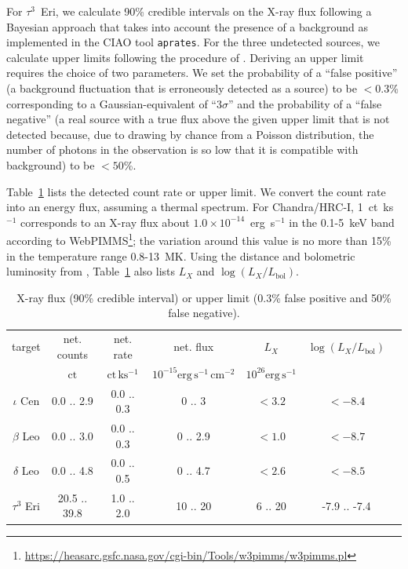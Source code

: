 \documentclass[linenumbers]{aastex631}
\begin{document}
For $\tau^3$~Eri, we calculate 90\% credible intervals on the X-ray flux following a Bayesian approach that
takes into account the presence of a background \citep{2014ApJ...796...24P} as implemented in the CIAO tool \texttt{aprates}. For the three undetected sources, we calculate upper limits following the procedure of \citet{2010ApJ...719..900K}. Deriving an upper limit requires the choice of two parameters. We set the probability of a ``false positive'' (a background fluctuation that is erroneously detected as a source) to be $<0.3$\% corresponding to a
Gaussian-equivalent of ``$3\sigma$'' and the probability of a ``false negative'' (a real source with a true flux above the given upper limit that is not detected because, due to drawing by chance from a Poisson distribution,  the number of photons in the observation is so low that it is compatible with background) to be $<50$\%.


Table~\ref{tab:detections} lists the detected count rate or upper limit. We convert the count rate into an energy flux, assuming a thermal spectrum. For Chandra/HRC-I,
1~ct~ks$^{-1}$ corresponds to an X-ray flux about $1.0\times10^{-14}$~erg~s$^{-1}$ in the 0.1-5~keV band according to WebPIMMS\footnote{\url{https://heasarc.gsfc.nasa.gov/cgi-bin/Tools/w3pimms/w3pimms.pl}}; the variation around this value is no more than 15\% in the temperature range 0.8-13~MK. Using the distance and bolometric luminosity from \citet{2002ApJ...579..800S}, Table~\ref{tab:detections} also lists $L_X$ and $\log(L_X/L_\mathrm{bol})$.
\begin{table}
\caption{X-ray flux (90\% credible interval) or upper limit (0.3\% false positive and 50\% false negative).\label{tab:detections}}
\begin{tabular}{ccccccc}
  \hline \hline
target & net. counts & net. rate & net. flux & $L_X$ & $\log(L_X/L_\mathrm{bol})$\\
 & $\mathrm{ct}$ & $\mathrm{ct\,ks^{-1}}$ & $10^{-15}\mathrm{erg\,s^{-1}\,cm^{-2}}$ & $10^{26}\mathrm{erg\,s^{-1}}$ \\
\hline
$\iota$ Cen & 0.0 ..  2.9 & 0.0 ..  0.3 & 0 ..   3 &  $<3.2$ & $<-8.4$ \\
$\beta$ Leo & 0.0 ..  3.0 & 0.0 ..  0.3 & 0 .. 2.9 &  $<1.0$ & $<-8.7$ \\
$\delta$ Leo & 0.0 ..  4.8 & 0.0 ..  0.5 & 0 .. 4.7 &  $<2.6$ & $<-8.5$ \\
$\tau^3$ Eri & 20.5 .. 39.8 & 1.0 ..  2.0 & 10 ..   20 & 6 .. 20 & -7.9 .. -7.4 \\
\hline
\end{tabular}
\end{table}
\end{document}
